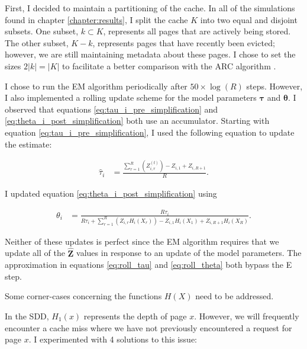   First, I decided to maintain a partitioning of the cache. In all of the
  simulations found in chapter \ref{chapter:results}, I split the cache $K$ into
  two equal and disjoint subsets. One subset, $k \subset K$, represents all
  pages that are actively being stored. The other subset, $K - k$, represents
  pages that have recently been evicted; however, we are still maintaining
  metadata about these pages. I chose to set the sizes $2|k| = |K|$ to
  facilitate a better comparison with the ARC algorithm \cite{arc}.

  I chose to run the EM algorithm periodically after $50 \times \log(R)$ steps.
  However, I also implemented a rolling update scheme for the model parameters
  $\bm{\tau}$ and $\bm{\theta}$. I observed that equations
  \ref{eq:tau_i_pre_simplification} and \ref{eq:theta_i_post_simplification}
  both use an accumulator. Starting with equation
  \ref{eq:tau_i_pre_simplification}, I used the following equation to update the
  estimate:

  \begin{align}
  \label{eq:roll_tau}
    \hat{\tau}_i &=
      \frac{\sum_{r=1}^{R} \left(Z_{i, r}^{(t)} \right) -
            Z_{i, 1} + Z_{i, R + 1}}
           {R} .
  \end{align}

  I updated equation \ref{eq:theta_i_post_simplification} using

  \begin{align}
  \label{eq:roll_theta}
    \theta_i &=
      \frac
        {R \tau_i}
        {R \tau_i + \sum_{r=1}^{R} \left( Z_{i, r} H_i(X_r) \right) -
          Z_{i, 1} H_i(X_1) + Z_{i, R + 1} H_i(X_R)
        } .
  \end{align}

  Neither of these updates is perfect since the EM algorithm requires that we
  update all of the $\hat{\bm{Z}}$ values in response to an update of the model
  parameters. The approximation in equations \ref{eq:roll_tau} and
  \ref{eq:roll_theta} both bypass the E step.

  Some corner-cases concerning the functions $H(X)$ need to be addressed.

  In the SDD, $H_1(x)$ represents the depth of page $x$. However, we will
  frequently encounter a cache miss where we have not previously encountered a
  request for page $x$. I experimented with 4 solutions to this issue:


